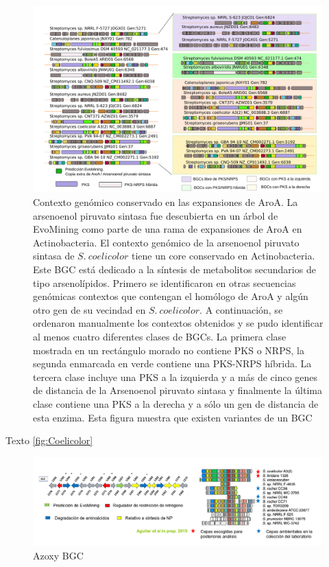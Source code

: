\documentclass[12pt,twoside]{reedthesis}
\begin{document}
  \begin{figure}[h!tbp]
  \centering
  \includegraphics[angle = 0,scale = .4]{chapter3/Coelicolor.pdf}
  \caption[EvoMining Algorithm]{\footnotesize{Contexto genómico conservado en las expansiones de AroA. La arsenoenol piruvato sintasa fue descubierta en un árbol de EvoMining como parte de una rama de expansiones de AroA en Actinobacteria. El contexto genómico de la arsenoenol piruvato sintasa de $S.~coelicolor$ tiene un core conservado en Actinobacteria. Este BGC está dedicado a la síntesis de metabolitos secundarios de tipo arsenolípidos. Primero se identificaron en otras secuencias genómicas contextos que contengan el homólogo de AroA y algún otro gen de su vecindad en $S.~coelicolor$. A continuación, se ordenaron manualmente los contextos obtenidos y se pudo identificar al menos cuatro diferentes clases de BGCs. La primera clase mostrada en un rectángulo morado no contiene PKS o NRPS, la segunda enmarcada en verde contiene una PKS-NRPS híbrida. La tercera clase incluye una PKS a la izquierda y a más de cinco genes de distancia de la Arsenoenol piruvato sintasa y finalmente la última clase contiene una PKS a la derecha y a sólo un gen de distancia de esta enzima. Esta figura muestra que existen variantes de un BGC }}
  \label{fig:Coelicolor}
  \end{figure}
  
  Texto \autoref{fig:Coelicolor}
  
  \begin{figure}[h!tbp]
  \centering
  \includegraphics[angle = 0,scale = .4]{chapter3/azoxy.png}
  \caption[EvoMining Algorithm]{\footnotesize{Azoxy BGC}}
  \label{fig:azoxy}
  \end{figure}
  
\end{document}
